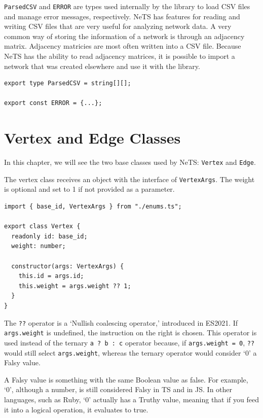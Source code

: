 \texttt{ParsedCSV} and \texttt{ERROR} are types used internally
by the library to load CSV files and manage error messages, respectively.
NeTS has features for reading and writing CSV files that are very useful for
analyzing network data.
A very common way of storing the information of a network is
through an adjacency matrix.
Adjacency matricies are most often written into a CSV file.
Because NeTS has the ability to read adjacency matrices,
it is possible to import a network that was created elsewhere
and use it with the library.

\begin{verbatim}
export type ParsedCSV = string[][];

export const ERROR = {...};
\end{verbatim}

\section{Vertex and Edge Classes}

In this chapter, we will see the two base classes used by NeTS:
\texttt{Vertex} and \texttt{Edge}.

The vertex class receives an object with the interface of \texttt{VertexArgs}.
The weight is optional and set to 1 if not provided as a parameter.

\begin{verbatim}
import { base_id, VertexArgs } from "./enums.ts";

export class Vertex {
  readonly id: base_id;
  weight: number;

  constructor(args: VertexArgs) {
    this.id = args.id;
    this.weight = args.weight ?? 1;
  }
}
\end{verbatim}

The \texttt{??} operator is a `Nullish coalescing operator,' introduced in ES2021.
If \texttt{args.weight} is undefined, the instruction on the right is chosen.
This operator is used instead of the ternary \texttt{a ? b : c} operator
because, if \texttt{args.weight = 0},
\texttt{??} would still select \texttt{args.weight},
whereas the ternary operator would consider `0' a Falsy value.

A Falsy value is something with the same Boolean value as false.
For example, `0', although a number, is still considered Falsy in TS and in JS.
In other languages, such as Ruby, `0' actually has a Truthy value,
meaning that if you feed it into a logical operation, it evaluates to true.

